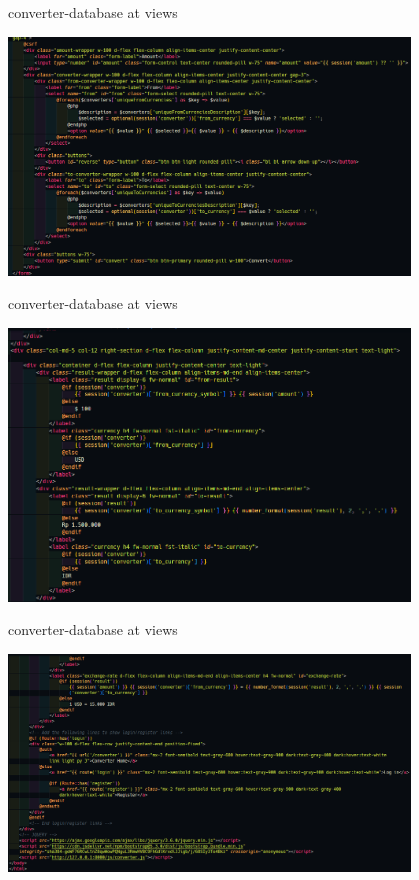 \documentclass[aspectratio=169, table]{beamer}
\begin{document}
\begin{frame}{converter-database at views}
 \vskip1cm
 \begin{center}
  \includegraphics[width=0.8\textwidth]{classFiles/pertemuan-13-converter-database-part-2.png}
 \end{center}
\end{frame}

\begin{frame}{converter-database at views}
 \vskip1cm
 \begin{center}
  \includegraphics[width=0.8\textwidth]{classFiles/pertemuan-13-converter-database-part-3.png}
 \end{center}
\end{frame}

\begin{frame}{converter-database at views}
 \vskip1cm
 \begin{center}
  \includegraphics[width=0.8\textwidth]{classFiles/pertemuan-13-converter-database-part-4.png}
 \end{center}
\end{frame}
\end{document}
